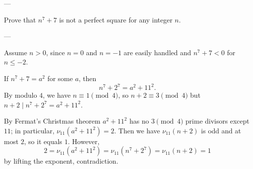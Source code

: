 
---

Prove that $n^7+7$ is not a perfect square for any integer $n$.

---

Assume $n>0$, since $n=0$ and $n=-1$ are easily handled and $n^7+7<0$ for $n\le-2$.

If $n^7+7=a^2$ for some $a$, then \[n^7+2^7=a^2+11^2.\]
By modulo $4$, we have $n\equiv1\pmod4$, so $n+2\equiv3\pmod4$ but $n+2\mid n^7+2^7=a^2+11^2$.

By Fermat's Christmas theorem $a^2+11^2$ has no $3\pmod4$ prime divisors except $11$; in particular, $\nu_{11}\left(a^2+11^2\right)=2$. Then we have $\nu_{11}(n+2)$ is odd and at most $2$, so it equals $1$. However,
\[2=\nu_{11}\left(a^2+11^2\right)=\nu_{11}\left(n^7+2^7\right)=\nu_{11}(n+2)=1\]
by lifting the exponent, contradiction.
